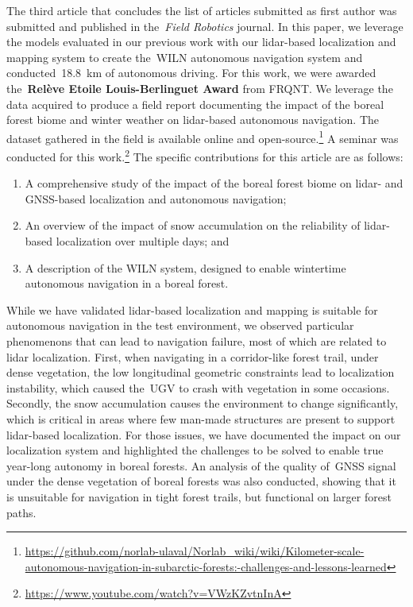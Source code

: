 \documentclass[12pt,letterpaper,oneside]{article}
\begin{document}
The third article that concludes the list of articles submitted as first author was submitted and published in the~\emph{Field Robotics} journal.
In this paper, we leverage the models evaluated in our previous work with our lidar-based localization and mapping system to create the~\ac{WILN} autonomous navigation system and conducted~\SI{18.8}{\kilo\meter} of autonomous driving.
For this work, we were awarded the~\textbf{Relève Etoile Louis-Berlinguet Award} from FRQNT. %
We leverage the data acquired to produce a field report documenting the impact of the boreal forest biome and winter weather on lidar-based autonomous navigation.
The dataset gathered in the field is available online and open-source.\footnote{\textwidth\url{https://github.com/norlab-ulaval/Norlab_wiki/wiki/Kilometer-scale-autonomous-navigation-in-subarctic-forests:-challenges-and-lessons-learned}}
A seminar was conducted for this work.\footnote{\url{https://www.youtube.com/watch?v=VWzKZvtnInA}}
The specific contributions for this article are as follows:
\begin{enumerate}
	\item A comprehensive study of the impact of the boreal forest biome on lidar- and \ac{GNSS}-based localization and autonomous navigation;  
	\item An overview of the impact of snow accumulation on the reliability of lidar-based localization over multiple days; and
	\item A description of the \ac{WILN} system, designed to enable wintertime autonomous navigation in a boreal forest.
\end{enumerate}
While we have validated lidar-based localization and mapping is suitable for autonomous navigation in the test environment, we observed particular phenomenons that can lead to navigation failure, most of which are related to lidar localization.
First, when navigating in a corridor-like forest trail, under dense vegetation, the low longitudinal geometric constraints lead to localization instability, which caused the~\ac{UGV} to crash with vegetation in some occasions.
Secondly, the snow accumulation causes the environment to change significantly, which is critical in areas where few man-made structures are present to support lidar-based localization.
For those issues, we have documented the impact on our localization system and highlighted the challenges to be solved to enable true year-long autonomy in boreal forests.
An analysis of the quality of~\ac{GNSS} signal under the dense vegetation of boreal forests was also conducted, showing that it is unsuitable for navigation in tight forest trails, but functional on larger forest paths.
\end{document}
